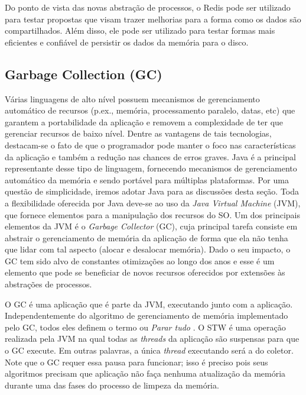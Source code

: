 
Do ponto de vista das novas abstração de processos, o Redis pode ser utilizado
para testar propostas que visam trazer melhorias para a forma como os dados são
compartilhados. Além disso, ele pode ser utilizado para testar formas mais
eficientes e confiável de persistir os dados da memória para o disco.

\subsection{Garbage Collection (GC)}
\label{sec:gc}

Várias linguagens de alto nível possuem mecanismos de gerenciamento automático de recursos
(p.ex., memória, processamento paralelo, datas, etc) que garantem a portabilidade
da aplicação e removem a complexidade de ter que gerenciar recursos de baixo
nível. Dentre as vantagens de tais tecnologias, destacam-se o fato de que o
programador pode manter o foco nas características da aplicação e também a redução
nas chances de erros graves. Java é a principal representante desse tipo de
linguagem, fornecendo mecanismos de gerenciamento automático da memória e sendo
portável para múltiplas plataformas. Por uma questão de simplicidade, iremos
adotar Java para as discussões desta seção. Toda a flexibilidade
oferecida por Java deve-se ao uso da \emph{Java Virtual Machine} (JVM), que
fornece elementos para a manipulação dos recursos do SO. Um dos principais
elementos da JVM é o \emph{Garbage Collector} (GC), cuja principal tarefa
consiste em abstrair o gerenciamento de memória da aplicação de forma que ela
não tenha que lidar com tal aspecto (alocar e desalocar memória). Dado o seu impacto, o
GC tem sido alvo de constantes otimizações ao longo dos anos e esse é um
elemento que pode se beneficiar de novos recursos oferecidos por extensões às
abstrações de processos.

O GC é uma aplicação que é parte da JVM, executando junto com a aplicação.
Independentemente do algoritmo de gerenciamento de memória implementado pelo
GC, todos eles definem o termo  ou
\emph{Parar tudo} \citep{gc_pauseless}. O STW é uma operação realizada pela
JVM  na qual todas as \emph{threads} da aplicação são suspensas para que o GC execute.
Em outras palavras, a única \emph{thread} executando será a do coletor. Note que o GC
requer essa pausa para funcionar; isso é preciso pois seus algoritmos precisam que
aplicação não faça nenhuma atualização da memória durante uma das fases do
processo de limpeza da memória.

